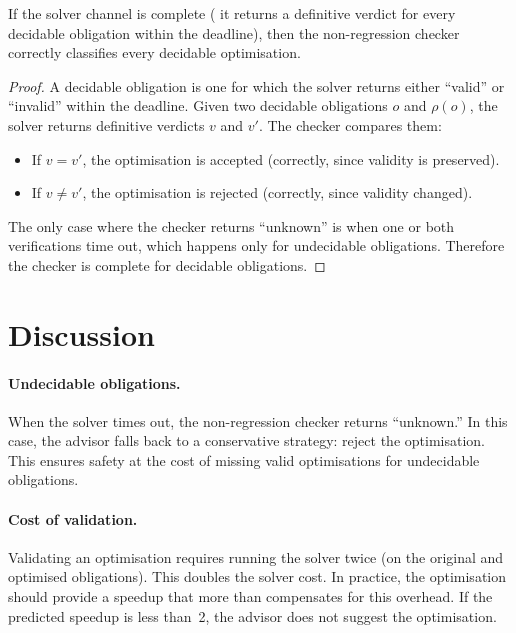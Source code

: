 \documentclass[11pt]{article}
\begin{document}
\begin{theorem}\label{thm:valcomp}
If the solver channel is complete (\ie{} it returns a
definitive verdict for every decidable obligation within
the deadline), then the non-regression checker correctly
classifies every decidable optimisation.
\end{theorem}
\begin{proof}
A decidable obligation is one for which the solver
returns either ``valid'' or ``invalid'' within the
deadline.  Given two decidable obligations $o$ and
$\rho(o)$, the solver returns definitive verdicts
$v$ and $v'$.  The checker compares them:
\begin{itemize}
\item If $v = v'$, the optimisation is accepted (correctly,
      since validity is preserved).
\item If $v \neq v'$, the optimisation is rejected
      (correctly, since validity changed).
\end{itemize}
The only case where the checker returns ``unknown'' is
when one or both verifications time out, which happens
only for undecidable obligations.  Therefore the checker
is complete for decidable obligations.
\end{proof}

\section{Discussion}\label{sec:discussion}

\paragraph{Undecidable obligations.}
When the solver times out, the non-regression checker
returns ``unknown.''  In this case, the advisor falls
back to a conservative strategy: reject the optimisation.
This ensures safety at the cost of missing valid
optimisations for undecidable obligations.

\paragraph{Cost of validation.}
Validating an optimisation requires running the solver
twice (on the original and optimised obligations).
This doubles the solver cost.  In practice, the
optimisation should provide a speedup that more than
compensates for this overhead.  If the predicted
speedup is less than~2, the advisor does not suggest
the optimisation.
\end{document}
